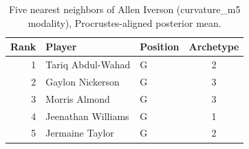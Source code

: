 \begin{table}[htbp]
  \centering\small
  \begin{tabular}{rllc}
    \toprule
    Rank & Player & Position & Archetype \\
    \midrule
    1 & Tariq Abdul-Wahad & G & 2 \\
    2 & Gaylon Nickerson & G & 3 \\
    3 & Morris Almond & G & 3 \\
    4 & Jeenathan Williams & G & 1 \\
    5 & Jermaine Taylor & G & 2 \\
    \bottomrule
  \end{tabular}
  \caption{Five nearest neighbors of Allen Iverson (curvature_m5 modality), Procrustes-aligned posterior mean.}
  \label{tab:Allen_Iverson_neighbors_curvature_m5}
\end{table}

